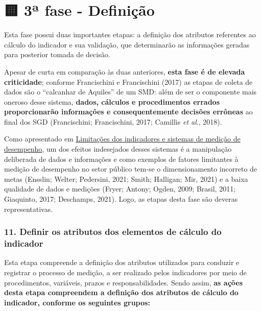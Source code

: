 \documentclass[
  letterpaper,
  DIV=11,
  numbers=noendperiod]{scrreprt}
\begin{document}
\hypertarget{uxaa-fase---definiuxe7uxe3o}{%
\chapter*{🟨 3ª fase - Definição}\label{uxaa-fase---definiuxe7uxe3o}}


{Esta fase possui duas importantes etapas: a definição dos atributos
referentes ao cálculo do indicador e sua validação, que determinarão as
informações geradas para posterior tomada de decisão.}

Apesar de curta em comparação às duas anteriores, \textbf{esta fase é de
elevada criticidade}; conforme Francischini e Francischini (2017) as
etapas de coleta de dados são o ``calcanhar de Aquiles'' de um SMD: além
de ser o componente mais oneroso desse sistema, \textbf{dados, cálculos
e procedimentos errados proporcionarão informações e consequentemente
decisões errôneas} ao final dos SGD (Francischini; Francischini, 2017;
Camillis \emph{et al}., 2018).

Como apresentado em
\href{/o/AZWDclIWFqqJuBEvyQWk/s/ws6bIBOPv2tLRHdwbB7y/~/changes/788/1.-apresentacao/1.4-consequencias-indesejadas-e-limitacoes-da-medicao-de-desempenho}{Limitações
dos indicadores e sistemas de medição de desempenho}, um dos efeitos
indesejados desses sistemas é a manipulação deliberada de dados e
informações e como exemplos de fatores limitantes à medição de
desempenho no setor público tem-se o dimensionamento incorreto de metas
(Ensslin; Welter; Pedersini, 2021; Smith; Halligan; Mir, 2021) e a baixa
qualidade de dados e medições (Fryer; Antony; Ogden, 2009; Brasil, 2011;
Giaquinto, 2017; Deschamps, 2021). Logo, as etapas desta fase são
deveras representativas.

\hypertarget{definir-os-atributos-dos-elementos-de-cuxe1lculo-do-indicador}{%
\subsection*{11. Definir os atributos dos elementos de cálculo do
indicador}\label{definir-os-atributos-dos-elementos-de-cuxe1lculo-do-indicador}}

Esta etapa compreende a definição dos atributos utilizados para conduzir
e registrar o processo de medição, a ser realizado pelos indicadores por
meio de procedimentos, variáveis, prazos e responsabilidades. Sendo
assim, \textbf{as ações desta etapa compreendem a definição dos
atributos de cálculo do indicador, conforme os seguintes grupos:}
\end{document}
